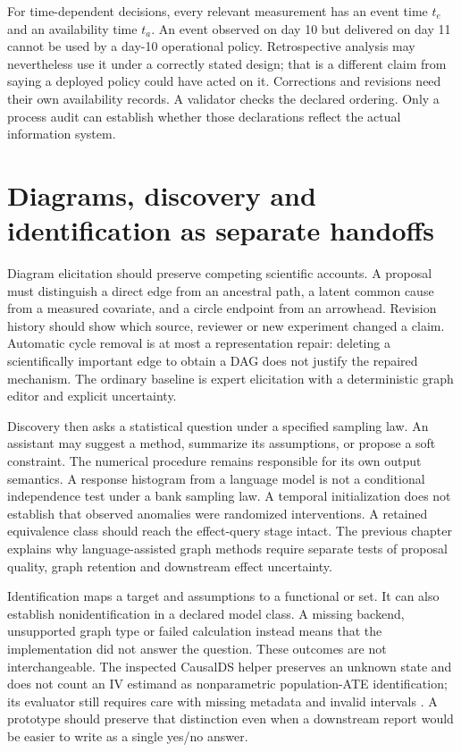 For time-dependent decisions, every relevant measurement has an event time
$t_e$ and an availability time $t_a$. An event observed on day 10 but delivered
on day 11 cannot be used by a day-10 operational policy. Retrospective analysis
may nevertheless use it under a correctly stated design; that is a different
claim from saying a deployed policy could have acted on it. Corrections and
revisions need their own availability records. A validator checks the declared
ordering. Only a process audit can establish whether those declarations reflect
the actual information system.

\section{Diagrams, discovery and identification as separate handoffs}

Diagram elicitation should preserve competing scientific accounts. A proposal
must distinguish a direct edge from an ancestral path, a latent common cause
from a measured covariate, and a circle endpoint from an arrowhead. Revision
history should show which source, reviewer or new experiment changed a claim.
Automatic cycle removal is at most a representation repair: deleting a
scientifically important edge to obtain a DAG does not justify the repaired
mechanism. The ordinary baseline is expert elicitation with a deterministic
graph editor and explicit uncertainty.

Discovery then asks a statistical question under a specified sampling law.
An assistant may suggest a method, summarize its assumptions, or propose a soft
constraint. The numerical procedure remains responsible for its own output
semantics. A response histogram from a language model is not a conditional
independence test under a bank sampling law. A temporal initialization does not
establish that observed anomalies were randomized interventions. A retained
equivalence class should reach the effect-query stage intact. The previous
chapter explains why language-assisted graph methods require separate tests of
proposal quality, graph retention and downstream effect uncertainty.

Identification maps a target and assumptions to a functional or set. It can
also establish nonidentification in a declared model class. A missing backend,
unsupported graph type or failed calculation instead means that the
implementation did not answer the question. These outcomes are not
interchangeable. The inspected CausalDS helper preserves an unknown state and
does not count an IV estimand as nonparametric population-ATE identification;
its evaluator still requires care with missing metadata and invalid intervals
\cite{v12_la_package_causalds}. A prototype should preserve that distinction even
when a downstream report would be easier to write as a single yes/no answer.

